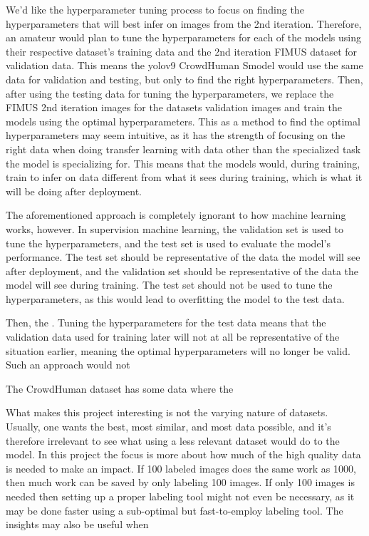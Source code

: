 We'd like the hyperparameter tuning process to focus on finding the hyperparameters that will best infer on images from the 2nd iteration. Therefore, an amateur would plan to tune the hyperparameters for each of the models using their respective dataset's training data and the 2nd iteration FIMUS dataset for validation data. This means the yolov9 CrowdHuman Smodel would use the same data for validation and testing, but only to find the right hyperparameters. Then, after using the testing data for tuning the hyperparameters, we replace the FIMUS 2nd iteration images for the datasets validation images and train the models using the optimal hyperparameters. This as a method to find the optimal hyperparameters may seem intuitive, as it has the strength of focusing on the right data when doing transfer learning with data other than the specialized task the model is specializing for. This means that the models would, during training, train to infer on data different from what it sees during training, which is what it will be doing after deployment.

The aforementioned approach is completely ignorant to how machine learning works, however. In supervision machine learning, the validation set is used to tune the hyperparameters, and the test set is used to evaluate the model's performance. The test set should be representative of the data the model will see after deployment, and the validation set should be representative of the data the model will see during training. The test set should not be used to tune the hyperparameters, as this would lead to overfitting the model to the test data.

Then, the . Tuning the hyperparameters for the test data means that the validation data used for training later will not at all be representative of the situation earlier, meaning the optimal hyperparameters will no longer be valid. Such an approach would not


The CrowdHuman dataset has some data where the


What makes this project interesting is not the varying nature of datasets. Usually, one wants the best, most similar, and most data possible, and it's therefore irrelevant to see what using a less relevant dataset would do to the model. In this project the focus is more about how much of the high quality data is needed to make an impact. If 100 labeled images does the same work as 1000, then much work can be saved by only labeling 100 images. If only 100 images is needed then setting up a proper labeling tool might not even be necessary, as it may be done faster using a sub-optimal but fast-to-employ labeling tool. The insights may also be useful when

